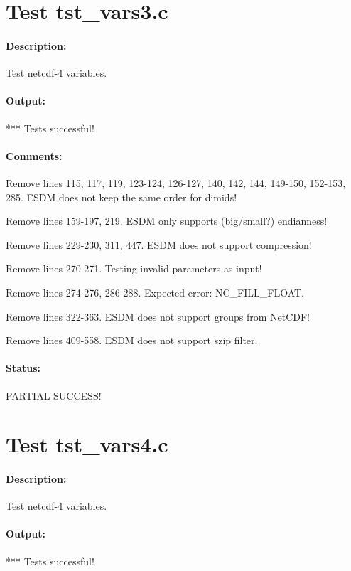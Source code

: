 \section{Test tst\_vars3.c}

\paragraph{Description:} Test netcdf-4 variables.

\paragraph{Output:} *** Tests successful!

\paragraph{Comments:} Remove lines 115, 117, 119, 123-124, 126-127, 140, 142, 144, 149-150, 152-153, 285. ESDM does not keep the same order for dimids!

Remove lines 159-197, 219. ESDM only supports (big/small?) endianness!

Remove lines 229-230, 311, 447. ESDM does not support compression!

Remove lines 270-271. Testing invalid parameters as input!

Remove lines 274-276, 286-288. Expected error: NC\_FILL\_FLOAT.

Remove lines 322-363. ESDM does not support groups from NetCDF!

Remove lines 409-558. ESDM does not support szip filter.

\paragraph{Status:} PARTIAL SUCCESS!

\section{Test tst\_vars4.c}

\paragraph{Description:} Test netcdf-4 variables.

\paragraph{Output:} *** Tests successful!


